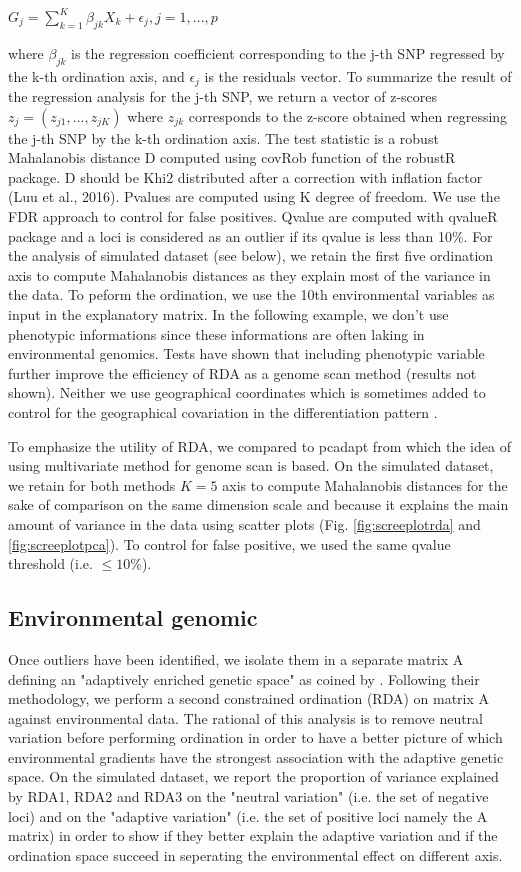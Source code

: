 \documentclass[a4paper,times,10pt,authoryear]{article}%
\begin{document}
$G_j = \sum^{K}_{k=1}\beta_{jk}X_{k}+\epsilon_{j}, j=1,...,p$

where $\beta_{jk}$ is the regression coefficient corresponding to the j-th SNP regressed by the k-th ordination axis, and $\epsilon_{j}$ is the residuals vector. To summarize the result of the regression analysis for the j-th SNP, we return a vector of z-scores $z_{j} = (z_{j1}, ..., z_{jK})$ where $z_{jk}$ corresponds to the z-score obtained when regressing the j-th SNP by the k-th ordination axis.
The test statistic is a robust Mahalanobis distance D computed using covRob function of the robustR package. D should be Khi2 distributed after a correction with inflation factor (Luu et al., 2016). Pvalues are computed using K degree of freedom. We use the FDR approach to control for false positives. Qvalue are computed with qvalueR package and a loci is considered as an outlier if its qvalue is less than 10\%.
For the analysis of simulated dataset (see below), we retain the first five ordination axis to compute Mahalanobis distances as they explain most of the variance in the data. To peform the ordination, we use the 10th environmental variables as input in the explanatory matrix. In the following example, we don't use phenotypic informations since these informations are often laking in environmental genomics. Tests have shown that including phenotypic variable further improve the efficiency of RDA as a genome scan method (results not shown). Neither we use geographical coordinates which is sometimes added to control for the geographical covariation in the differentiation pattern \citep{Frichot2013}.

To emphasize the utility of RDA, we compared to pcadapt from which the idea of using multivariate method for genome scan is based. On the simulated dataset, we retain for both methods $K=5$ axis to compute Mahalanobis distances for the sake of comparison on the same dimension scale and because it explains the main amount of variance in the data using scatter plots (Fig. \ref{fig:screeplotrda} and \ref{fig:screeplotpca}). To control for false positive, we used the same qvalue threshold (i.e. $\leq 10\%$).


\subsection{Environmental genomic}

Once outliers have been identified, we isolate them in a separate matrix A defining an "adaptively enriched genetic space" as coined by \citet{Steane2014a}. Following their methodology, we perform a second constrained ordination (RDA) on matrix A against environmental data. The rational of this analysis is to remove neutral variation before performing ordination in order to have a better picture of which environmental gradients have the strongest association with the adaptive genetic space. On the simulated dataset, we report the proportion of variance explained by RDA1, RDA2 and RDA3 on the "neutral variation" (i.e. the set of negative loci) and on the "adaptive variation" (i.e. the set of positive loci namely the A matrix) in order to show if they better explain the adaptive variation and if the ordination space succeed in seperating the environmental effect on different axis.
\end{document}
